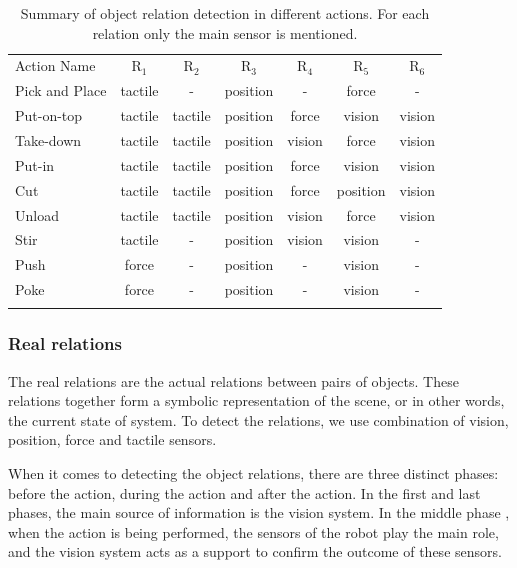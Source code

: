 \begin{table}
\centering
\caption{Summary of object relation detection in different actions. For each relation only the main sensor is mentioned.}
\begin{tabular}{ lcccccc }
\hline\noalign{\smallskip}
 Action Name &  $\text{R}_1$ & $\text{R}_2$ &$\text{R}_3$ &$\text{R}_4$ &$\text{R}_5$&$\text{R}_6$ \\
\noalign{\smallskip}\hline\noalign{\smallskip}
 Pick and Place & tactile & -       & position & -     &  force & - \\
 Put-on-top     & tactile & tactile & position & force &  vision & vision \\
 Take-down      & tactile & tactile & position & vision&  force & vision \\
 Put-in         & tactile & tactile & position & force &  vision & vision \\
 Cut            & tactile & tactile & position & force &  position & vision \\
 Unload         & tactile & tactile & position & vision&  force & vision \\
 Stir           & tactile & -       & position & vision&  vision & - \\
 Push           & force   & -       & position & -     &  vision & - \\
 Poke           & force   & -       & position & -     &  vision & - \\
\noalign{\smallskip}\hline
\end{tabular}
\label{tab:relation_detection}
\end{table}



\subsubsection{Real relations}
\label{sec:real_relations}
The real relations are the actual relations between pairs of objects.
These relations together form a symbolic representation of the scene, or in other words, the current state of system.
To detect the relations, we use combination of vision, position, force and tactile sensors.

When it comes to detecting the object relations, there are three distinct phases: before the action, during the action and after the action.
In the first and last phases, the main source of information is the vision system.
In the middle phase , when the action is being performed, the sensors of the robot play the main role,
and the vision system acts as a support to confirm the outcome of these sensors.

